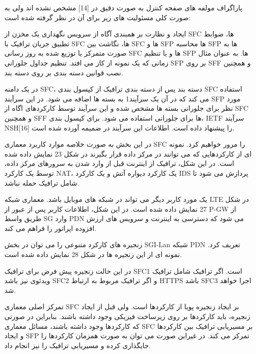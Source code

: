 \documentclass{book}
\begin{document}

پاراگراف{}
 مولفه های صفحه کنترل به صورت دقیق در [14] مشخص نشده اند ولی به صورت کلی مسئولیت های زیر برای آن در نظر گرفته شده است:


 ایجاد و نظارت بر همبندی آگاه از سرویس
 نگهداری یک مخزن از SFC ها، ضوابط تطبیق جریان ترافیک با SFC ها، نگاشت بین SFC ها و SFP ها
 محاسبه SFP ها به صورت متمرکز یا توزیع شده
 به روز رسانی SFC ها و یا تنظیم SFP ها. به عنوان مثال زمانی که یک نمونه از کار می افتد.
 تنظیم جداول جلورانی SFP بر روی SFF و همچنین نصب قوانین دسته بندی بر روی دسته بند.



در یک دامنه SFC، دسته بند پس از دسته بندی ترافیک از کپسول بندی SFC استفاده می کند که در آن یک سرآیند1 به بسته ها اضافه می شود. در این سرآیند SFP مورد نظر برای جلورانی بسته ها مشخص شده و این سرآیند توسط کارکردهای اگاه از SFC و همچنین SFF ها برای جلورانی استفاده می شود. برای کپسول بندی، IETF سرآیند NSH[16] را پیشنهاد داده است. اطلاعات این سرآیند در ضمیمه آورده شده است.


در این بخش به صورت خلاصه موارد کاربرد معماری SFC را مرور خواهیم کرد. نمونه ای از کارکردهایی که می توانند در مرکز داده قرار بگیرند در شکل 23 نمایش داده شده است. در این شکل، ترافیک از اینترنت قبل از وارد شدن به سرورهای مرکز داده، توسط یک کارکرد NAT، یک کارکرد دیواره آتش و یک کارکرد IDS پردازش می شود تا شامل ترافیک حمله نباشد.

یک مورد کاربر دیگر می تواند در شبکه های موبایل باشد. معماری شبکه LTE در شکل 27  نمایش داده شده است. در این شکل، اطلاعات کاربر پس از عبور از P-GW از طریق واسط SG وارد PDN می شود که دسترسی به اینترنت و سرویس های ارزش افزوده اپراتور را فراهم می کند.

زنجیره های کارکرد متنوعی را  می توان در بخش SGI-Lan شبکه PDN تعریف کرد. نمونه ای از این زنجیره ها در شکل 28 نمایش داده شده است.

در این حالت زنجیره پیش فرض برای ترافیک SFC1 است. اگر ترافیک شامل ترافیک ویدئوی نیز باشد SFC2 و اگر ترافیک مربوط به ارتباط HTTPS باشد SFC3 اجرا خواهد شد.


تمرکز اصلی معماری SFC بر ایجاد زنجیره پویا از کارکردها است. ولی قبل از ایجاد زنجیره، باید کارکردها بر روی زیرساخت فیزیکی وجود داشته باشند. بنابراین در صورتی که کارکردها وجود داشته باشند، مسائل معماری SFC بر مسیریابی ترافیک بین کارکردها و ایجاد SFP تمرکز می کند. در غیراین صورت می توان به صورت همزمان کارکردها را جایگذاری کرده و مسیریابی ترافیک را نیز انجام داد.
\end{document}
